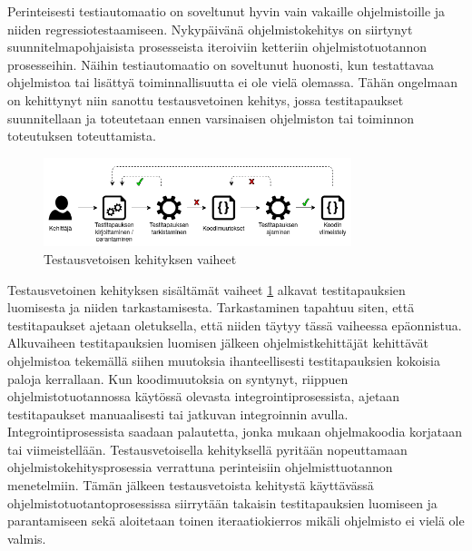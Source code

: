   Perinteisesti testiautomaatio on soveltunut hyvin vain vakaille ohjelmistoille ja niiden regressiotestaamiseen.
  Nykypäivänä ohjelmistokehitys on siirtynyt suunnitelmapohjaisista prosesseista iteroiviin ketteriin ohjelmistotuotannon prosesseihin.
  Näihin testiautomaatio on soveltunut huonosti, kun testattavaa ohjelmistoa tai lisättyä toiminnallisuutta ei ole vielä olemassa.
  Tähän ongelmaan on kehittynyt niin sanottu testausvetoinen kehitys, jossa testitapaukset suunnitellaan ja toteutetaan ennen varsinaisen ohjelmiston tai toiminnon toteutuksen toteuttamista.

  \begin{figure}[H]
    \centering
    \includegraphics[width=0.8\textwidth]{assets/testausvetoinen-kehitys.png}
    \caption{Testausvetoisen kehityksen vaiheet}
    \label{fig:testausvetoinen-kehitys}
  \end{figure}

  Testausvetoinen kehityksen sisältämät vaiheet \ref{fig:testausvetoinen-kehitys} alkavat testitapauksien luomisesta ja niiden tarkastamisesta.
  Tarkastaminen tapahtuu siten, että testitapaukset ajetaan oletuksella, että niiden täytyy tässä vaiheessa epäonnistua.
  Alkuvaiheen testitapauksien luomisen jälkeen ohjelmistkehittäjät kehittävät ohjelmistoa tekemällä siihen muutoksia ihanteellisesti testitapauksien kokoisia paloja kerrallaan.
  Kun koodimuutoksia on syntynyt, riippuen ohjelmistotuotannossa käytössä olevasta integrointiprosessista, ajetaan testitapaukset manuaalisesti tai jatkuvan integroinnin avulla.
  Integrointiprosessista saadaan palautetta, jonka mukaan ohjelmakoodia korjataan tai viimeistellään.
  Testausvetoisella kehityksellä pyritään nopeuttamaan ohjelmistokehitysprosessia verrattuna perinteisiin ohjelmisttuotannon menetelmiin.
  Tämän jälkeen testausvetoista kehitystä käyttävässä ohjelmistotuotantoprosessissa siirrytään takaisin testitapauksien luomiseen ja parantamiseen sekä aloitetaan toinen iteraatiokierros mikäli ohjelmisto ei vielä ole valmis.

